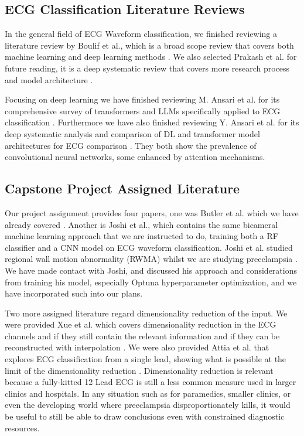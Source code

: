 \documentclass[sigconf,nonacm]{acmart}
\begin{document}
\subsection{ECG Classification Literature Reviews}
In the general field of ECG Waveform classification, we finished reviewing a literature review by Boulif et al., which is a broad scope review that covers both machine learning and deep learning methods \cite{boulif_literature_2023}. We also selected Prakash et al. for future reading, it is a deep systematic review that covers more research process and model architecture \cite{jaya_prakash_advances_2025}.

Focusing on deep learning we have finished reviewing M. Ansari et al. for its comprehensive survey of transformers and LLMs specifically applied to ECG classification \cite{ansari_survey_2025}. Furthermore we have also finished reviewing Y. Ansari et al. for its deep systematic analysis and comparison of DL and transformer model architectures for ECG comparison \cite{ansari_deep_2023}. They both show the prevalence of convolutional neural networks, some enhanced by attention mechanisms.

\subsection{Capstone Project Assigned Literature}

Our project assignment provides four papers, one was Butler et al. which we have already covered \cite{butler_ai-based_2024}. Another is Joshi et al., which contains the same bicameral machine learning approach that we are instructed to do, training both a RF classifier and a CNN model on ECG waveform classification. Joshi et al. studied regional wall motion abnormality (RWMA) whilst we are studying preeclampsia \cite{joshi_linking_2025}. We have made contact with Joshi, and discussed his approach and considerations from training his model, especially Optuna hyperparameter optimization, and we have incorporated such into our plans.

Two more assigned literature regard dimensionality reduction of the input. We were provided Xue et al. which covers dimensionality reduction in the ECG channels and if they still contain the relevant information and if they can be reconstructed with interpolation \cite{xue_does_2024}. We were also provided Attia et al. that explores ECG classification from a single lead, showing what is possible at the limit of the dimensionality reduction \cite{attia_automated_2022}. Dimensionality reduction is relevant because a fully-kitted 12 Lead ECG is still a less common measure used in larger clinics and hospitals. In any situation such as for paramedics, smaller clinics, or even the developing world where preeclampsia disproportionately kills, it would be useful to still be able to draw conclusions even with constrained diagnostic resources.
\end{document}

